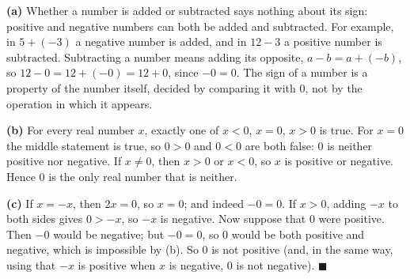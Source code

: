 \textbf{(a)} Whether a number is added or subtracted says nothing about its sign: positive and negative numbers can both be added and subtracted. For example, in $5+(-3)$ a negative number is added, and in $12-3$ a positive number is subtracted. Subtracting a number means adding its opposite, $a-b=a+(-b)$, so $12-0=12+(-0)=12+0$, since $-0=0$. The sign of a number is a property of the number itself, decided by comparing it with $0$, not by the operation in which it appears.

\textbf{(b)} For every real number $x$, exactly one of $x<0$, $x=0$, $x>0$ is true. For $x=0$ the middle statement is true, so $0>0$ and $0<0$ are both false: $0$ is neither positive nor negative. If $x\ne0$, then $x>0$ or $x<0$, so $x$ is positive or negative. Hence $0$ is the only real number that is neither.

\textbf{(c)} If $x=-x$, then $2x=0$, so $x=0$; and indeed $-0=0$. If $x>0$, adding $-x$ to both sides gives $0>-x$, so $-x$ is negative. Now suppose that $0$ were positive. Then $-0$ would be negative; but $-0=0$, so $0$ would be both positive and negative, which is impossible by (b). So $0$ is not positive (and, in the same way, using that $-x$ is positive when $x$ is negative, $0$ is not negative). $\blacksquare$
